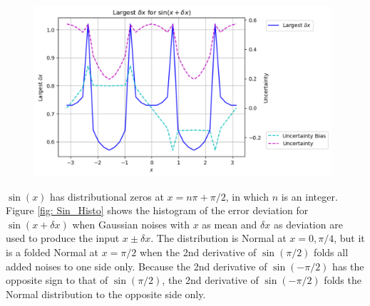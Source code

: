 \documentclass[twoside]{article}
\numberwithin{equation}{section}
\begin{document}
\begin{figure}[p]
\centering
\includegraphics[height=2.5in]{Sin_Conv_Edge.pdf} 
\label{fig: Sin_Conv_Edge}
\end{figure}

$\sin(x)$ has distributional zeros at $x=n\pi +\pi/2$, in which $n$ is an integer.
Figure \ref{fig: Sin_Histo} shows the histogram of the error deviation for $\sin(x + \delta x)$ when Gaussian noises with $x$ as mean and $\delta x$ as deviation are used to produce the input $x \pm \delta x$.
The distribution is Normal at $x = 0, \pi/4$, but it is a folded Normal at $x = \pi/2$ when the 2nd derivative of $\sin(\pi/2)$ folds all added noises to one side only.
Because the 2nd derivative of $\sin(-\pi/2)$ has the opposite sign to that of $\sin(\pi/2)$, the 2nd derivative of $\sin(-\pi/2)$ folds the Normal distribution to the opposite side only.
\end{document}

